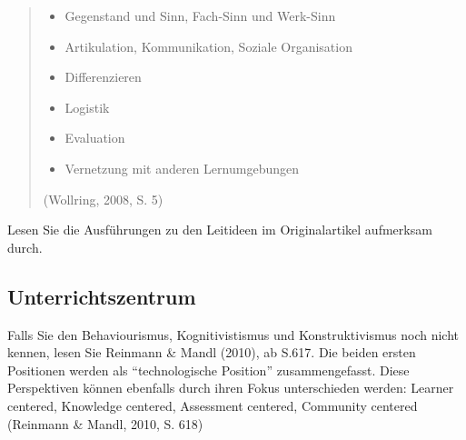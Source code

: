 \documentclass[
  10pt,
  a4paper,
  DIV=11]{scrartcl}
\providecommand{\tightlist}{%
  \setlength{\itemsep}{0pt}\setlength{\parskip}{0pt}}\usepackage{longtable,booktabs,array}
\begin{document}
\begin{quote}
\begin{itemize}
\tightlist
\item
  Gegenstand und Sinn, Fach-Sinn und Werk-Sinn
\item
  Artikulation, Kommunikation, Soziale Organisation
\item
  Differenzieren
\item
  Logistik
\item
  Evaluation
\item
  Vernetzung mit anderen Lernumgebungen
\end{itemize}

(Wollring, 2008, S. 5)
\end{quote}

\begin{tcolorbox}[enhanced jigsaw, title=\textcolor{quarto-callout-tip-color}{\faLightbulb}\hspace{0.5em}{Tipp}, colbacktitle=quarto-callout-tip-color!10!white, breakable, leftrule=.75mm, arc=.35mm, toptitle=1mm, opacityback=0, coltitle=black, left=2mm, opacitybacktitle=0.6, colback=white, bottomtitle=1mm, colframe=quarto-callout-tip-color-frame, titlerule=0mm, rightrule=.15mm, bottomrule=.15mm, toprule=.15mm]

Lesen Sie die Ausführungen zu den Leitideen im Originalartikel
aufmerksam durch.

\end{tcolorbox}

\subsection{Unterrichtszentrum}\label{unterrichtszentrum}

Falls Sie den Behaviourismus, Kognitivistismus und Konstruktivismus noch
nicht kennen, lesen Sie Reinmann \& Mandl (2010), ab S.617. Die beiden
ersten Positionen werden als ``technologische Position''
zusammengefasst. Diese Perspektiven können ebenfalls durch ihren Fokus
unterschieden werden: Learner centered, Knowledge centered, Assessment
centered, Community centered (Reinmann \& Mandl, 2010, S. 618)
\end{document}
